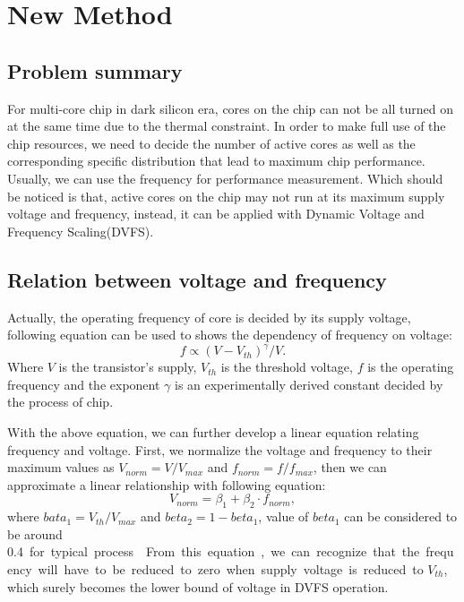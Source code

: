 \section{New Method}
\subsection{Problem summary}
For multi-core chip in dark silicon era, cores on the chip can not be all turned on at the same time due to the
thermal constraint. In order to make full use of the chip resources, we need to decide the number of active cores as
well as the corresponding specific distribution that lead to maximum chip performance. Usually, we can use the frequency
for performance measurement. Which should be noticed is that, active cores on the chip may not run at its maximum supply voltage
and frequency, instead, it can be applied with Dynamic Voltage and Frequency Scaling(DVFS).
\subsection{Relation between voltage and frequency}
Actually, the operating frequency of core is decided by its supply voltage, following equation can be used to shows the dependency
of frequency on voltage:
\begin{equation}\label{v_and_f}
f \propto (V-V_{th})^{\gamma}/V.
\end{equation}
Where $V$ is the transistor's supply, $V_{th}$ is the threshold voltage, $f$ is the operating frequency and the exponent
$\gamma$ is an experimentally derived constant decided by the process of chip.

With the above equation, we can further develop a linear equation relating frequency and voltage. First, we normalize the
voltage and frequency to their maximum values as $V_{norm}=V/V_{max}$ and $f_{norm}=f/f_{max}$, then we can approximate a linear
relationship with following equation:
\begin{equation}\label{V_and_f_linear}
V_{norm} = \beta_1+\beta_2 \cdot f_{norm},
\end{equation}
where $bata_1=V_{th}/V_{max}$ and $beta_2=1-beta_1$, value of $beta_1$ can be considered to be around \SI{0.4} for typical process\cite{Taylor:MICRO'13}.
From this equation, we can recognize that the frequency will have to be reduced to zero when supply voltage is reduced to $V_{th}$,
which surely becomes the lower bound of voltage in DVFS operation.
